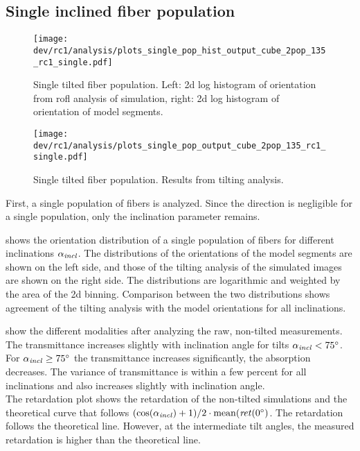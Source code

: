 \subsection{Single inclined fiber population}
\label{sec:resSingleIncl}
%
\begin{figure}[!t]
\centering
\texttt{[image: dev/rc1/analysis/plots\_single\_pop\_hist\_output\_cube\_2pop\_135\_rc1\_single.pdf]}
\caption[sim]{Single tilted fiber population. Left: 2d log histogram of orientation from rofl analysis of simulation, right: 2d log histogram of orientation of model segments. }
\label{fig:single_fiber_pop_hist}
\end{figure}
%
\begin{figure}[!p]
\centering
\texttt{[image: dev/rc1/analysis/plots\_single\_pop\_output\_cube\_2pop\_135\_rc1\_single.pdf]}
\caption[]{Single tilted fiber population. Results from tilting analysis.}
\label{fig:single_fiber_pop_rofl}
\end{figure}
%
First, a single population of fibers is analyzed.
Since the direction is negligible for a single population, only the inclination parameter \modelInc{} remains.
\par
%
 shows the orientation distribution of a single population of fibers for different inclinations $\textnormal{$\alpha_{\mathit{incl}}$}{}$.
The distributions of the orientations of the model segments are shown on the left side, and those of the tilting analysis of the simulated images are shown on the right side.
The distributions are logarithmic and weighted by the area of the 2d binning.
Comparison between the two distributions shows agreement of the tilting analysis with the model orientations for all inclinations.
\par
%
 show the different modalities after analyzing the raw, non-tilted measurements.
The transmittance increases slightly with inclination angle for tilts $\textnormal{$\alpha_{\mathit{incl}}$}<\SI{75}{\degree}$.
For $\textnormal{$\alpha_{\mathit{incl}}$} \ge \SI{75}{\degree}$ the transmittance increases significantly, \ie{} the absorption decreases.
The variance of transmittance is within a few percent for all inclinations and also increases slightly with inclination angle.
\\
%
The retardation plot shows the retardation of the non-tilted simulations and the theoretical curve that follows $(\cos(\textnormal{$\alpha_{\mathit{incl}}$}) + 1) / 2 \cdot \mathrm{mean}(\mathit{ret}(\SI{0}{\degree})$.
The retardation follows the theoretical line.
However, at the intermediate tilt angles, the measured retardation is higher than the theoretical line.
